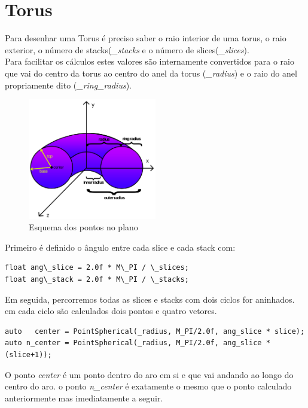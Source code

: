 \documentclass[a4paper]{report}
\begin{document}
\section{Torus}
Para desenhar uma Torus é preciso saber o raio interior de uma torus, o raio
exterior, o número de stacks(\textit{\_stacks} e o número de
slices(\textit{\_slices}).\\
Para facilitar os cálculos estes valores são internamente convertidos para o
raio que vai do centro da torus ao centro do anel da torus (\textit{\_radius}) e
o raio do anel propriamente dito (\textit{\_ring\_radius}).

\begin{figure}[H]
    \centering 
    \includegraphics[width=0.5\textwidth]{images/torus_points.png}
    \caption{Esquema dos pontos no plano}
    \label{fig:scheme_torus}
\end{figure}
Primeiro é definido o ângulo entre cada slice e cada stack com:
\begin{lstlisting}
float ang\_slice = 2.0f * M\_PI / \_slices;
float ang\_stack = 2.0f * M\_PI / \_stacks;
\end{lstlisting}
Em seguida, percorremos todas as slices e stacks com dois ciclos for aninhados.
em cada ciclo são calculados dois pontos e quatro vetores.\\

\begin{lstlisting}
auto   center = PointSpherical(_radius, M_PI/2.0f, ang_slice * slice);
auto n_center = PointSpherical(_radius, M_PI/2.0f, ang_slice * (slice+1));
\end{lstlisting}
O ponto \textit{center} é um ponto dentro do aro em si e que vai andando ao
longo do centro do aro. o ponto \textit{n\_center} é exatamente o mesmo que o
ponto calculado anteriormente mas imediatamente a seguir.
\end{document}
